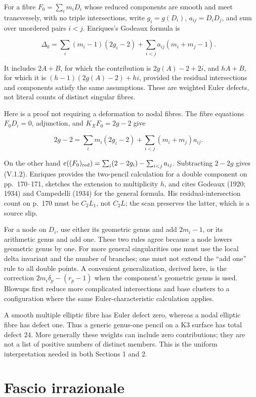 For a fibre \(F_0=\sum_i m_iD_i\) whose reduced components are smooth and meet transversely, with no triple intersections, write \(g_i=g(D_i)\), \(a_{ij}=D_iD_j\), and sum over unordered pairs \(i<j\). Enriques's Godeaux formula is

\[
\Delta_0=\sum_i(m_i-1)(2g_i-2)
 +\sum_{i<j}a_{ij}(m_i+m_j-1). \tag{V.1.2}
\]

It includes \(2A+B\), for which the contribution is \(2g(A)-2+2i\), and \(hA+B\), for which it is \((h-1)(2g(A)-2)+hi\), provided the residual intersections and components satisfy the same assumptions. These are weighted Euler defects, not literal counts of distinct singular fibres.

Here is a proof not requiring a deformation to nodal fibres. The fibre equations \(F_0D_i=0\), adjunction, and \(K_X F_0=2g-2\) give

\[
2g-2=\sum_i m_i(2g_i-2)+\sum_{i<j}(m_i+m_j)a_{ij}.
\]

On the other hand \(e((F_0)_{\rm red})=\sum_i(2-2g_i)-\sum_{i<j}a_{ij}\). Subtracting \(2-2g\) gives (V.1.2). Enriques provides the two-pencil calculation for a double component on pp.~170--171, sketches the extension to multiplicity \(h\), and cites Godeaux (1920; 1934) and Campedelli (1934) for the general formula. His residual-intersection count on p.~170 must be \(C_2L_1\), not \(C_2L\); the scan preserves the latter, which is a source slip.

For a node on \(D_i\), use either its geometric genus and add \(2m_i-1\), or its arithmetic genus and add one. These two rules agree because a node lowers geometric genus by one. For more general singularities one must use the local delta invariant and the number of branches; one must not extend the ``add one'' rule to all double points. A convenient generalization, derived here, is the correction \(2m_i\delta_p-(r_p-1)\) when the component's geometric genus is used. Blowups first reduce more complicated intersections and base clusters to a configuration where the same Euler-characteristic calculation applies.

A smooth multiple elliptic fibre has Euler defect zero, whereas a nodal elliptic fibre has defect one. Thus a generic genus-one pencil on a K3 surface has total defect \(24\). More generally these weights can include zero contributions; they are not a list of positive numbers of distinct members. This is the uniform interpretation needed in both Sections 1 and 2.

\section{Fascio irrazionale}
\label{cp1-v-2}

